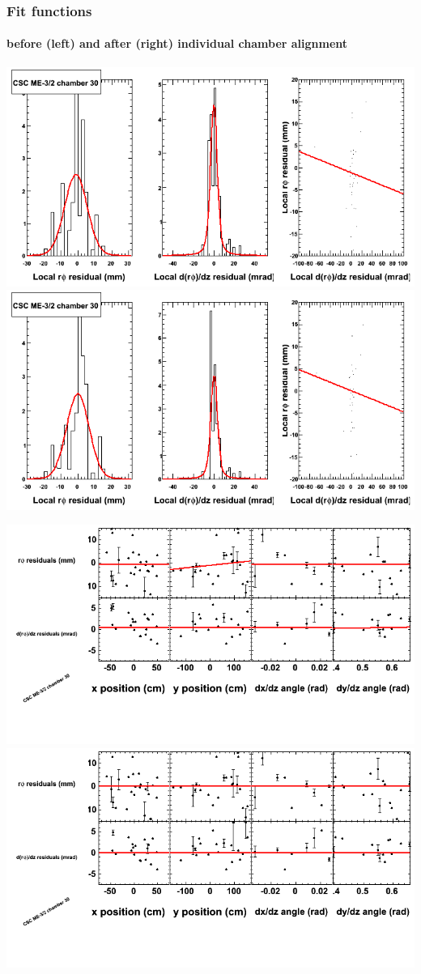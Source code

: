 \documentclass[compress]{beamer}
\begin{document}
\begin{frame}
\frametitle{Fit functions}
\framesubtitle{before (left) and after (right) individual chamber alignment}
\includegraphics[width=0.5\linewidth]{ringfits_3dof/beforefit_MEm32_30_bellcurve.png} \includegraphics[width=0.5\linewidth]{ringfits_3dof/afterfit_MEm32_30_bellcurve.png}

\includegraphics[width=0.5\linewidth]{ringfits_3dof/beforefit_MEm32_30_polynomials.png} \includegraphics[width=0.5\linewidth]{ringfits_3dof/afterfit_MEm32_30_polynomials.png}
\end{frame}
\end{document}
